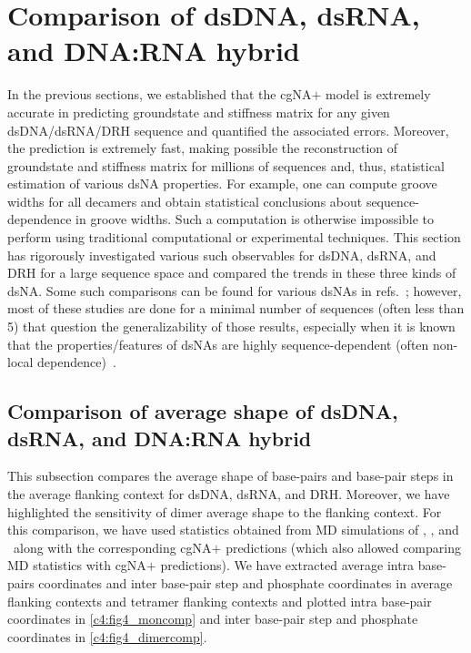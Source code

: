 \section{Comparison of dsDNA, dsRNA, and DNA:RNA hybrid} \label{c4:s5}
In the previous sections, we established that the cgNA$+$ model is extremely accurate in predicting groundstate and stiffness matrix for any given dsDNA/dsRNA/DRH sequence and quantified the associated errors. 
Moreover, the prediction is extremely fast, making possible the reconstruction of groundstate and stiffness matrix for millions of sequences and, thus, statistical estimation of various dsNA properties. 
For example, one can compute groove widths for all decamers and obtain statistical conclusions about sequence-dependence in groove widths. 
Such a computation is otherwise impossible to perform using traditional computational or experimental techniques.
This section has rigorously investigated various such observables for dsDNA, dsRNA, and DRH for a large sequence space and compared the trends in these three kinds of dsNA.
Some such comparisons can be found for various dsNAs in refs.~\cite{noy2004relative,noy2005structure,marin2020double,vsponer2006computational,suresh2014dna,priyakumar2008atomic,cheatham1997molecular,perez2004relative}; however, most of these studies are done for a minimal number of sequences (often less than 5) that question the generalizability of those results, especially when it is known that the properties/features of dsNAs are highly sequence-dependent (often non-local dependence)~\cite{balaceanu2019modulation,beveridge2004molecular,dixit2005molecular,pasi2014muabc,lavery2010systematic}. \clearpage

\subsection{Comparison of average shape of dsDNA, dsRNA, and DNA:RNA hybrid} \label{c4:s5sb1}
This subsection compares the average shape of base-pairs and base-pair steps in the average flanking context for dsDNA, dsRNA, and DRH. 
Moreover, we have highlighted the sensitivity of dimer average shape to the flanking context.
For this comparison, we have used statistics obtained from MD simulations of \Lbdna, \Lbrna, and \Lbdrh \ along with the corresponding cgNA$+$ predictions (which also allowed comparing MD statistics with cgNA$+$ predictions).
We have extracted average intra base-pairs coordinates and inter base-pair step and phosphate coordinates in average flanking contexts and tetramer flanking contexts and plotted intra base-pair coordinates in \cref{c4:fig4_moncomp} and inter base-pair step and phosphate coordinates in \cref{c4:fig4_dimercomp}.

